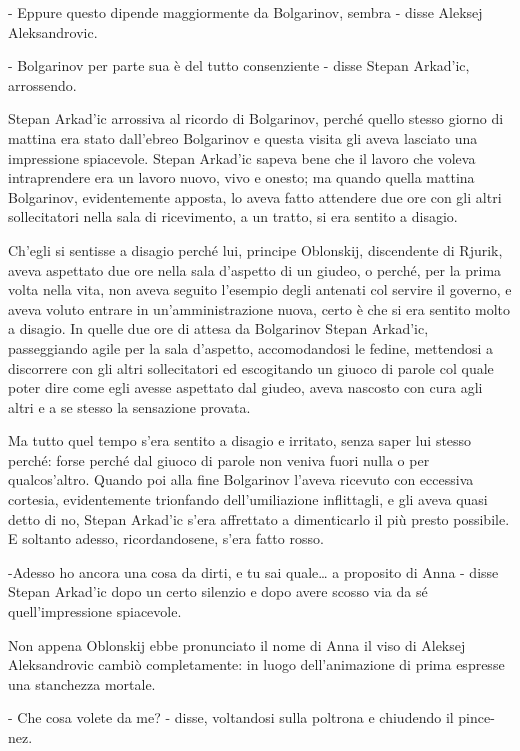 - Eppure questo dipende maggiormente da Bolgarinov, sembra - disse Aleksej Aleksandrovic. 

- Bolgarinov per parte sua è del tutto consenziente - disse Stepan Arkad'ic, arrossendo. 

Stepan Arkad'ic arrossiva al ricordo di Bolgarinov, perché quello stesso giorno di mattina era stato dall'ebreo Bolgarinov e questa visita gli aveva lasciato una impressione spiacevole. Stepan Arkad'ic sapeva bene che il lavoro che voleva intraprendere era un lavoro nuovo, vivo e onesto; ma quando quella mattina Bolgarinov, evidentemente apposta, lo aveva fatto attendere due ore con gli altri sollecitatori nella sala di ricevimento, a un tratto, si era sentito a disagio. 

Ch'egli si sentisse a disagio perché lui, principe Oblonskij, discendente di Rjurik, aveva aspettato due ore nella sala d'aspetto di un giudeo, o perché, per la prima volta nella vita, non aveva seguito l'esempio degli antenati col servire il governo, e aveva voluto entrare in un'amministrazione nuova, certo è che si era sentito molto a disagio. In quelle due ore di attesa da Bolgarinov Stepan Arkad'ic, passeggiando agile per la sala d'aspetto, accomodandosi le fedine, mettendosi a discorrere con gli altri sollecitatori ed escogitando un giuoco di parole col quale poter dire come egli avesse aspettato dal giudeo, aveva nascosto con cura agli altri e a se stesso la sensazione provata. 

Ma tutto quel tempo s'era sentito a disagio e irritato, senza saper lui stesso perché: forse perché dal giuoco di parole non veniva fuori nulla o per qualcos'altro. Quando poi alla fine Bolgarinov l'aveva ricevuto con eccessiva cortesia, evidentemente trionfando dell'umiliazione inflittagli, e gli aveva quasi detto di no, Stepan Arkad'ic s'era affrettato a dimenticarlo il più presto possibile. E soltanto adesso, ricordandosene, s'era fatto rosso. 

-Adesso ho ancora una cosa da dirti, e tu sai quale\ldots{} a proposito di Anna - disse Stepan Arkad'ic dopo un certo silenzio e dopo avere scosso via da sé quell'impressione spiacevole. 

Non appena Oblonskij ebbe pronunciato il nome di Anna il viso di Aleksej Aleksandrovic cambiò completamente: in luogo dell'animazione di prima espresse una stanchezza mortale. 

- Che cosa volete da me? - disse, voltandosi sulla poltrona e chiudendo il pince-nez. 

